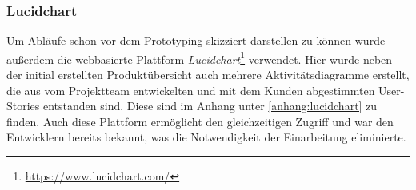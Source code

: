 \documentclass[10pt, a4paper]{article}
\begin{document}
\begin{onehalfspace}
      \subsubsection{Lucidchart}
      \label{Lucidchart}
      Um Abläufe schon vor dem Prototyping skizziert darstellen zu können wurde außerdem die webbasierte Plattform \textit{Lucidchart}\footnote{\raggedright\url{https://www.lucidchart.com/}} verwendet.
      Hier wurde neben der initial erstellten Produktübersicht auch mehrere Aktivitätsdiagramme erstellt, die aus vom Projektteam entwickelten und mit dem Kunden abgestimmten User-Stories entstanden sind.
      Diese sind im Anhang unter \ref{anhang:lucidchart} zu finden.
      Auch diese Plattform ermöglicht den gleichzeitigen Zugriff und war den Entwicklern bereits bekannt, was die Notwendigkeit der Einarbeitung eliminierte.


\end{onehalfspace}
\end{document}
